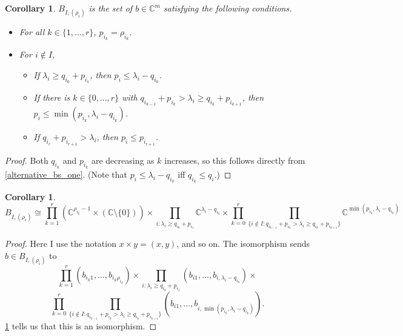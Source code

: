\documentclass[12pt,psamsfonts]{article}
\newtheorem{corollary}[theorem]{Corollary}
\begin{document}
\begin{corollary}\label{alternative_bs_two}
    \(B_{I, (\rho_i)}\) is the set of \(b \in \mathbb{C}^m\) satisfying the following conditions.
    \begin{itemize}
        \item For all \(k \in \{1, ..., r\}\), \(p_{i_k} = \rho_{i_k}\).
        \item For \(i \notin I\),
        \begin{itemize}
            \item If \(\lambda_i \geq q_{i_0} + p_{i_1}\), then \(p_i \leq \lambda_i - q_{i_0}\).
            \item If there is \(k \in \{0, ..., r\}\) with \(q_{i_{k - 1}} + p_{i_k} > \lambda_i \geq q_{i_k} + p_{i_{k + 1}}\), then \(p_i \leq \min(p_{i_k}, \lambda_i - q_{i_k})\).
            \item If \(q_{i_r} + p_{i_{r + 1}} > \lambda_i\), then \(p_i \leq p_{i_{r + 1}}\).
        \end{itemize}
    \end{itemize}
\end{corollary}
\begin{proof}
    Both \(q_{i_k}\) and \(p_{i_k}\) are decreasing as \(k\) increases, so this follows directly from \cref{alternative_bs_one}.
    (Note that \(p_i \leq \lambda_i - q_{i_k}\) iff \(q_{i_k} \leq q_i\).)
\end{proof}

\begin{corollary}\label{bs_iso}
    \[B_{I, (\rho_i)} \cong \prod_{k = 1}^r (\mathbb{C}^{\rho_{i_k} - 1} \times (\mathbb{C} \setminus \{0\})) \times \prod_{i : \lambda_i \geq q_{i_0} + p_{i_1}} \mathbb{C}^{\lambda_i - q_{i_0}} \times \prod_{k = 0}^r \prod_{\{i \notin I : q_{i_{k - 1}} + p_{i_k} > \lambda_i \geq q_{i_k} + p_{i_{k + 1}}\}}\mathbb{C}^{\min(p_{i_k}, \lambda_i - q_{i_k})}\]
\end{corollary}
\begin{proof}
    Here I use the notation \(x \times y = (x, y)\), and so on.
    The isomorphism sends \(b \in B_{I, (\rho_i)}\) to 
    \[\prod_{k = 1}^{r}(b_{i_k1},..., b_{i_k\rho_{i_k}}) \times \prod_{i : \lambda_i \geq q_{i_0} + p_{i_1}} (b_{i1}, ..., b_{i, \lambda_i - q_{i_0}}) \times\]
    \[\prod_{k = 0}^r \prod_{\{i \notin I : q_{i_{k - 1}} + p_{i_k} > \lambda_i \geq q_{i_k} + p_{i_{k + 1}}\}} (b_{i1}, ..., b_{i,\min(p_{i_k}, \lambda_i - q_{i_k})}).\]
    \cref{alternative_bs_two} tells us that this is an isomorphism.
\end{proof}
\end{document}
